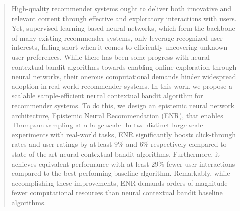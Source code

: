 \documentclass[sigconf]{acmart}
\begin{document}
\begin{abstract}
High-quality recommender systems ought to deliver both innovative and relevant content through effective and exploratory interactions with users. Yet, supervised learning-based neural networks, which form the backbone of many existing recommender systems, only leverage recognized user interests, falling short when it comes to efficiently uncovering unknown user preferences. While there has been some progress with neural contextual bandit algorithms towards enabling online exploration through neural networks, their onerous computational demands hinder widespread adoption in real-world recommender systems. In this work, we propose a scalable sample-efficient neural contextual bandit algorithm for recommender systems. To do this, we design an epistemic neural network architecture, Epistemic Neural Recommendation (ENR), that enables Thompson sampling at a large scale.
In two distinct large-scale experiments with real-world tasks, ENR significantly boosts click-through rates and user ratings by at least $9\%$ and $6\%$ respectively compared to state-of-the-art neural contextual bandit algorithms. Furthermore, it achieves equivalent performance with at least $29\%$ fewer user interactions compared to the best-performing baseline algorithm. Remarkably, while accomplishing these improvements, ENR demands orders of magnitude fewer computational resources than neural contextual bandit baseline algorithms.

\end{abstract}
\end{document}
